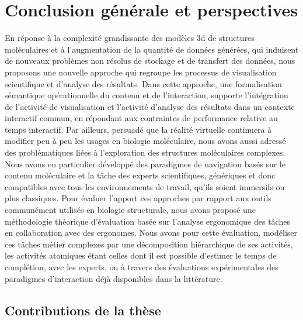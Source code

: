 


\chapter*{Conclusion générale et perspectives}
\mtcaddchapter

\mtcaddpart


En réponse à la complexité grandissante des modèles 3d de structures moléculaires et à l'augmentation de la quantité de données générées, qui induisent de nouveaux problèmes non résolus de stockage et de transfert des données, nous proposons une nouvelle approche qui  
regroupe les processus de visualisation scientifique et d'analyse des résultats. Dans cette approche, une formalisation sémantique opérationnelle du contenu et de l'interaction, supporte l'intégration de l'activité de visualisation et l'activité d'analyse des résultats dans un contexte interactif commun, en répondant aux contraintes de performance relative au temps interactif. Par ailleurs, persuadé que la réalité virtuelle continuera à modifier peu à peu les usages en biologie moléculaire, nous avons aussi adressé des problématiques liées à l'exploration des structures moléculaires complexes. Nous avons en particulier développé des paradigmes de navigation basés sur le contenu moléculaire et la tâche des experts scientifiques, génériques et donc compatibles avec tous les environnements de travail, qu'ils soient immersifs ou plus classiques. Pour évaluer l'apport ces approches par rapport aux outils communément utilisés en biologie structurale, nous avons proposé une méthodologie théorique d'évaluation basée sur l'analyse ergonomique des tâches en collaboration avec des ergonomes. Nous avons pour cette évaluation, modéliser ces tâches métier complexes par une décomposition hiérarchique de ses activités, les activités atomiques étant celles dont il est possible d'estimer le temps de complétion, avec les experts, ou à travers des évaluations expérimentales des paradigmes d'interaction déjà disponibles dans la littérature.

\section*{Contributions de la thèse}

